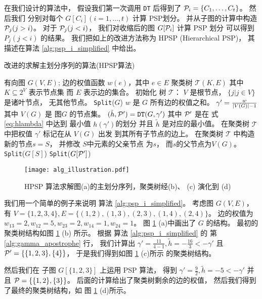 在我们设计的算法中，
假设我们第一次调用 \texttt{DT} 后得到了
$\P_i = \{C_1, \dots, C_t\}$。
然后我们 分别对每个
$G[C_i](i=1,\dots, t)$
计算 PSP划分。
并从子图的计算中构造 $\P_j(j>i)$。
对于 $\P_j(j<i)$，
我们对收缩后的图 $G[\P_i]$ 计算 PSP 划分
可以得到  $P_j(j<i)$ 的结果。
我们把如上的改进方法称为 HPSP (Hierarchical PSP)，
其描述在算法 \ref{alg:psp_i_simplified} 中给出。

\begin{algorithm}[!ht]
	\caption{改进的求解主划分序列的算法(HPSP算法)}\label{alg:psp_i_simplified}
	\begin{algorithmic}[1]
		\REQUIRE 有向图 $G(V, E)$; 边的权值函数 $w(e)$，其中 $e\in E$
		\ENSURE 聚类树 $\mathcal{T}(K, E)$ 其中 $K \subseteq 2^{V}$ 表示节点集
    而 $E$ 表示边的集合。
		\STATE 初始化 树 $\mathcal{T}$：
     $V$ 是根节点，
     $\{j | j \in V\}$ 是诸叶节点，
     无其他节点。
		\STATE \texttt{Split}($G$)
		\STATE $w$ 是 $G$ 所有边的权值之和。
		\STATE $\gamma' = \frac{w}{\abs{V(G)}-1}$
    其中 $V(G)$ 是 图$G$
    的节点集。
    \label{alg:gamma_apostrophe}
		\STATE $(\tilde{h}, \P')
    = \texttt{DT}(G, \gamma')$ 其中
    $\P'$ 是在 式 \eqref{eq:hlambda} 中达到
    最小值 $h(\gamma')$的划分
    并且 $\tilde{h}$ 是对应的最小值。 \label{line:DT}
		\STATE 在聚类树
    $\mathcal{T}$ 中把权值 $\gamma'$ 标记在从 $V(G)$ 出发
    到其所有子节点的边上。
		\ELSE
		\STATE 在聚类树
    $\mathcal{T}$ 中构造新的节点$s=S$，
    并修改 $S$中元素的父亲节点 为$s$，
    而$s$的父节点为$V(G)$。
		\STATE \texttt{Split}($G[S]$) \label{line:SplitDown}
		\ENDFOR 
		\STATE \texttt{Split}($G[\P']$)		\label{line:SplitUp}
		\ENDIF
		\ENDFUNCTION
	\end{algorithmic}
\end{algorithm}

\begin{figure}[!ht]
	\centering
	\texttt{[image: alg\_illustration.pdf]}
	\caption{HPSP 算法求解图(a)的主划分序列，聚类树经(b)、 (c) 演化到 (d) }\label{fig:alg_eg}
\end{figure}

\begin{example}
	我们用一个简单的例子来说明
  算法 \ref{alg:psp_i_simplified}。
  考虑图 $G(V, E)$，有 $V=\{1,2,3,4\}, E=\{(1,2),(1,3),(2,3),(1,4),(2,4)\}$。
  边的权值为 $w_{13}=2, w_{12}=5, w_{23}=2, w_{14}=1, w_{24}=1$。
	图 \ref{fig:alg_eg} (a)中画出了 $G$
  的结构。
  最初的聚类树结构如图 \ref{fig:alg_eg} (b)
  所示。
  根据 
  算法 \ref{alg:psp_i_simplified} 的
  第 \ref{alg:gamma_apostrophe} 行，
  我们计算出 $\gamma' = \frac{11}{4-1}, \tilde{h} = -\frac{16}{3} < -\gamma' $
  且 $\P' = \{\{1,2,3\},\{4\}\}$，
  于是我们得到如图 \ref{fig:alg_eg} (c)所示
  的聚类树结构。
	
	然后我们在 子图 $G[\{1,2,3\}]$ 上运用 PSP 算法，
  得到 $\gamma' = \frac{9}{2}, \tilde{h} = -5 < -\gamma'$
  并且 $\P= \{\{1,2\},\{3\}\}$。 
  后面的计算给出了聚类树剩余的边的权值，
  然后我们得到了最终的聚类树结构，如
  图 \ref{fig:alg_eg} (d)所示。
\end{example}	

